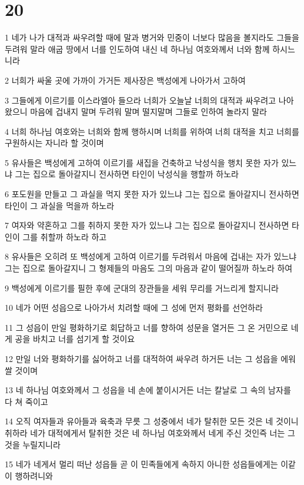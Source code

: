 \chapter{20}

\par 1 네가 나가 대적과 싸우려할 때에 말과 병거와 민중이 너보다 많음을 볼지라도 그들을 두려워 말라 애굽 땅에서 너를 인도하여 내신 네 하나님 여호와께서 너와 함께 하시느니라
\par 2 너희가 싸울 곳에 가까이 가거든 제사장은 백성에게 나아가서 고하여
\par 3 그들에게 이르기를 이스라엘아 들으라 너희가 오늘날 너희의 대적과 싸우려고 나아왔으니 마음에 겁내지 말며 두려워 말며 떨지말며 그들로 인하여 놀라지 말라
\par 4 너희 하나님 여호와는 너희와 함께 행하시며 너희를 위하여 너희 대적을 치고 너희를 구원하시는 자니라 할 것이며
\par 5 유사들은 백성에게 고하여 이르기를 새집을 건축하고 낙성식을 행치 못한 자가 있느냐 그는 집으로 돌아갈지니 전사하면 타인이 낙성식을 행할까 하노라
\par 6 포도원을 만들고 그 과실을 먹지 못한 자가 있느냐 그는 집으로 돌아갈지니 전사하면 타인이 그 과실을 먹을까 하노라
\par 7 여자와 약혼하고 그를 취하지 못한 자가 있느냐 그는 집으로 돌아갈지니 전사하면 타인이 그를 취할까 하노라 하고
\par 8 유사들은 오히려 또 백성에게 고하여 이르기를 두려워서 마음에 겁내는 자가 있느냐 그는 집으로 돌아갈지니 그 형제들의 마음도 그의 마음과 같이 떨어질까 하노라 하여
\par 9 백성에게 이르기를 필한 후에 군대의 장관들을 세워 무리를 거느리게 할지니라
\par 10 네가 어떤 성읍으로 나아가서 치려할 때에 그 성에 먼저 평화를 선언하라
\par 11 그 성읍이 만일 평화하기로 회답하고 너를 향하여 성문을 열거든 그 온 거민으로 네게 공을 바치고 너를 섬기게 할 것이요
\par 12 만일 너와 평화하기를 싫어하고 너를 대적하여 싸우려 하거든 너는 그 성읍을 에워쌀 것이며
\par 13 네 하나님 여호와께서 그 성읍을 네 손에 붙이시거든 너는 칼날로 그 속의 남자를 다 쳐 죽이고
\par 14 오직 여자들과 유아들과 육축과 무릇 그 성중에서 네가 탈취한 모든 것은 네 것이니 취하라 네가 대적에게서 탈취한 것은 네 하나님 여호와께서 네게 주신 것인즉 너는 그것을 누릴지니라
\par 15 네가 네게서 멀리 떠난 성읍들 곧 이 민족들에게 속하지 아니한 성읍들에게는 이같이 행하려니와
